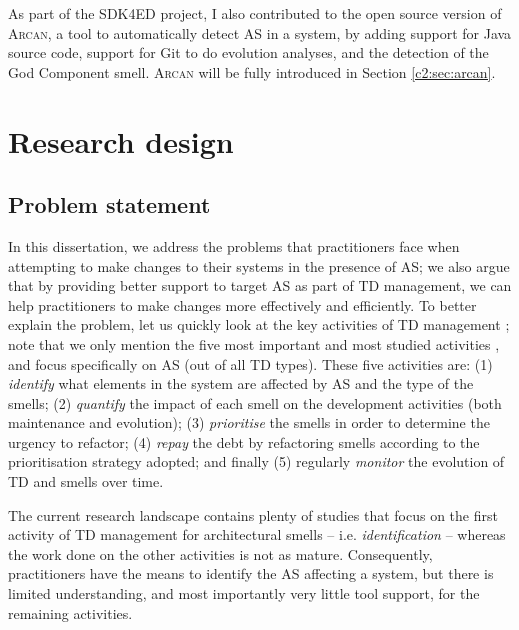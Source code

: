 As part of the SDK4ED project, I also contributed to the open source version of \textsc{Arcan}, a tool to automatically detect AS in a system, by adding support for Java source code, support for Git to do evolution analyses, and the detection of the God Component smell.
\textsc{Arcan} will be fully introduced in Section \ref{c2:sec:arcan}.

\section{Research design}\label{sec:intro:research-design}
\subsection{Problem statement}\label{sec:intro:problem-statement}
In this dissertation, we address the problems that practitioners face when attempting to make changes to their systems in the presence of AS; we also argue that by providing better support to target AS as part of TD management, we can help practitioners to make changes more effectively and efficiently. 
To better explain the problem, let us quickly look at the key activities of TD management \cite{Li2015}; note that we only mention the five most important and most studied activities \cite{Li2015}, and focus specifically on AS (out of all TD types).
These five activities are: (1) \emph{identify} what elements in the system are affected by AS and the type of the smells; (2) \emph{quantify} the impact of each smell on the development activities (both maintenance and evolution); (3) \emph{prioritise} the smells in order to determine the urgency to refactor; (4) \emph{repay} the debt by refactoring smells according to the prioritisation strategy adopted; and finally (5) regularly \emph{monitor} the evolution of TD and smells over time.

The current research landscape contains plenty of studies that focus on the first activity of TD management for architectural smells -- i.e.  \emph{identification} -- whereas the work done on the other activities is not as mature.
Consequently, practitioners have the means to identify the AS affecting a system, but there is limited understanding, and most importantly very little tool support, for the remaining activities.

